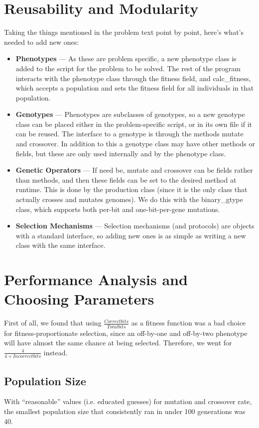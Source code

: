 \documentclass[a4paper,12pt]{article}
\begin{document}
\section{Reusability and Modularity}
Taking the things mentioned in the problem text point by point, here's what's needed to add new ones:
\begin{itemize}
\item{\textbf{Phenotypes} --- As these are problem specific, a new phenotype class is added to the script for the problem to be solved. The rest of the program interacts with the phenotype class through the fitness field, and calc\_fitness, which accepts a population and sets the fitness field for all individuals in that population.}
\item{\textbf{Genotypes} --- Phenotypes are subclasses of genotypes, so a new genotype class can be placed either in the problem-specific script, or in its own file if it can be reused. The interface to a genotype is through the methods mutate and crossover. In addition to this a genotype class may have other methods or fields, but these are only used internally and by the phenotype class.}
\item{\textbf{Genetic Operators} --- If need be, mutate and crossover can be fields rather than methods, and then these fields can be set to the desired method at runtime. This is done by the production class (since it is the only class that actually crosses and mutates genomes). We do this with the binary\_gtype class, which supports both per-bit and one-bit-per-gene mutations.}
\item{\textbf{Selection Mechanisms} --- Selection mechanisms (and protocols) are objects with a standard interface, so adding new ones is as simple as writing a new class with the same interface.}
\end{itemize}

\section{Performance Analysis and Choosing Parameters}
First of all, we found that using $\frac{Correct bits}{Total bits}$ as a fitness function was a bad choice for fitness-proportionate selection, since an off-by-one and off-by-two phenotype will have almost the same chance at being selected. Therefore, we went for $\frac{4}{4+Incorrect bits}$ instead. 

\subsection{Population Size}
With ``reasonable'' values (i.e. educated guesses) for mutation and crossover rate, the smallest population size that consistently ran in under 100 generations was 40. 
\end{document}
